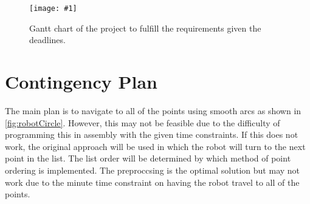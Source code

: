 \documentclass[12pt,conference,onecolumn]{article} %
\newcommand{\myfigure}[4]{
  \begin{figure}[h!]
      \centering
      \texttt{[image: \#1]}
      \caption{#2}
\label{#4}
    \end{figure}
}
\begin{document}
\myfigure{images/GanttChart.PNG}{Gantt chart of the project to fulfill the requirements given the deadlines.}{1}{fig:gantt}

\section*{Contingency Plan}
The main plan is to navigate to all of the points using smooth arcs as shown in \cref{fig:robotCircle}. However, this may not be feasible due to the difficulty of programming this in assembly with the given time constraints. If this does not work, the original approach will be used in which the robot will turn to the next point in the list. The list order will be determined by which method of point ordering is implemented. The preproccsing is the optimal solution but may not work due to the minute time constraint on having the robot travel to all of the points. 

\pagebreak
\printbibliography{}
\end{document}
